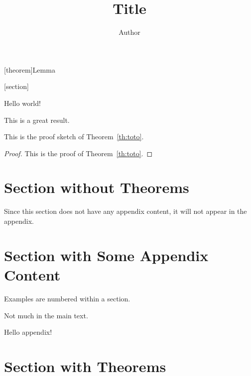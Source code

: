 \usepackage{hyperref}

[theorem]{Lemma}

[section]

\renewcommand{\appendixsectionformat}[2]{Material for #2 (Section~#1)}
\renewcommand{\appendixrefname}{Appendix References}

\title{Title}
\author{Author}



\maketitle

Hello world!

\begin{theoremrep}
  \label{th:toto}
  This is a great result.
\end{theoremrep}

\begin{proofsketch}
  This is the proof sketch of Theorem~\ref{th:toto}.
\end{proofsketch}

\begin{proof}
  This is the proof of Theorem~\ref{th:toto}.
\end{proof}

\section{Section without Theorems}

Since this section does not have any appendix content, it will not appear in the
appendix. \cite{brin1998anatomy}

\section{Section with Some Appendix Content}

\begin{example}
  Examples are numbered within a section.
\end{example}

Not much in the main text.

\begin{toappendix}
  Hello appendix!
\end{toappendix}

\section{Section with Theorems}

